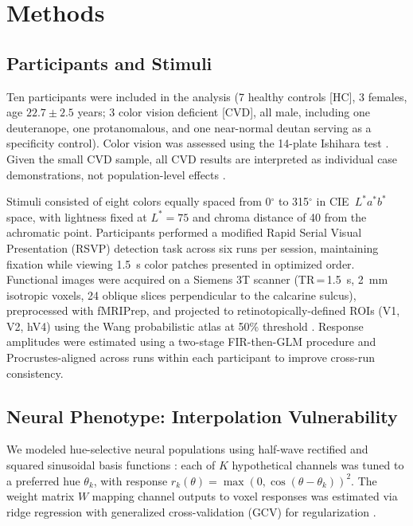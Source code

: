 \documentclass{article}
\begin{document}
\section{Methods}
\label{sec:methods}

\subsection{Participants and Stimuli}

Ten participants were included in the analysis (7 healthy controls [HC], 3 females, age $22.7 \pm 2.5$ years; 3 color vision deficient [CVD], all male, including one deuteranope, one protanomalous, and one near-normal deutan serving as a specificity control).
Color vision was assessed using the 14-plate Ishihara test \citep{ishihara1917}.
Given the small CVD sample, all CVD results are interpreted as individual case demonstrations, not population-level effects \citep{crawford1998}.

Stimuli consisted of eight colors equally spaced from 0$^\circ$ to 315$^\circ$ in CIE~$L^*a^*b^*$ space, with lightness fixed at $L^* = 75$ and chroma distance of 40 from the achromatic point.
Participants performed a modified Rapid Serial Visual Presentation (RSVP) detection task \citep{brouwer2009} across six runs per session, maintaining fixation while viewing 1.5~s color patches presented in optimized order.
Functional images were acquired on a Siemens 3T scanner (TR\,=\,1.5~s, 2~mm isotropic voxels, 24 oblique slices perpendicular to the calcarine sulcus), preprocessed with fMRIPrep, and projected to retinotopically-defined ROIs (V1, V2, hV4) using the Wang probabilistic atlas at 50\% threshold \citep{wang2015}.
Response amplitudes were estimated using a two-stage FIR-then-GLM procedure \citep{brouwer2009} and Procrustes-aligned across runs within each participant to improve cross-run consistency.

\subsection{Neural Phenotype: Interpolation Vulnerability}

We modeled hue-selective neural populations using half-wave rectified and squared sinusoidal basis functions \citep{brouwer2009}: each of $K$ hypothetical channels was tuned to a preferred hue $\theta_k$, with response $r_k(\theta) = \max(0, \cos(\theta - \theta_k))^2$.
The weight matrix $W$ mapping channel outputs to voxel responses was estimated via ridge regression with generalized cross-validation (GCV) for regularization \citep{golub1979}.
\end{document}
